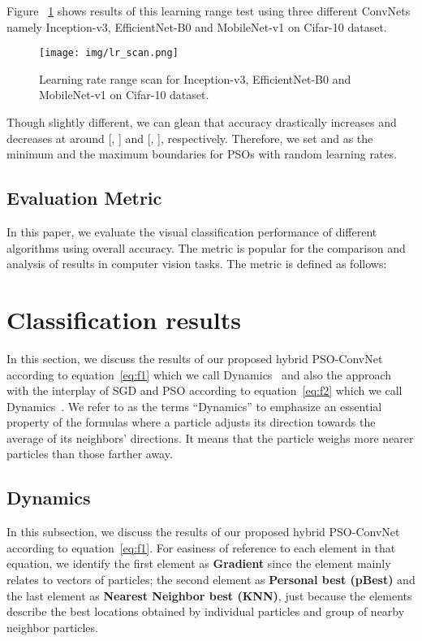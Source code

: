 \documentclass{ieeeaccess}
\begin{document}
Figure ~\ref{fig:lr_scan} shows results of this learning range test using three different ConvNets namely Inception-v3, EfficientNet-B0 and MobileNet-v1 on Cifar-10 dataset. 
\begin{figure}[htbp!]
\begin{center}
\texttt{[image: img/lr\_scan.png]}
\caption{Learning rate range scan for Inception-v3, EfficientNet-B0 and MobileNet-v1 on Cifar-10 dataset.}
\label{fig:lr_scan}
\end{center}
\end{figure}
Though slightly different, we can glean that accuracy drastically increases and decreases at around [, ] and [, ], respectively. Therefore, we set  and  as the minimum and the maximum boundaries for PSOs with random learning rates.
\subsection{Evaluation Metric}
In this paper, we evaluate the visual classification performance of different algorithms using overall accuracy. The metric is popular for the comparison and analysis of results in computer vision tasks. The metric is defined as follows:

\section{Classification results}
\label{sec:results}
In this section, we discuss the results of our proposed hybrid PSO-ConvNet according to equation~\eqref{eq:f1} which we call Dynamics~ and also the approach with the interplay of SGD and PSO according to equation~\eqref{eq:f2} which we call Dynamics~. We refer to as the terms ``Dynamics'' to emphasize an essential property of the formulas where a particle adjusts its direction towards the average of its neighbors' directions. It means that the particle weighs more nearer particles than those farther away.
\subsection{Dynamics~}
In this subsection, we discuss the results of our proposed hybrid PSO-ConvNet according to equation~\eqref{eq:f1}. For easiness of reference to each element in that equation, we identify the first element as \textbf{Gradient} since the element mainly relates to vectors of particles; the second element as \textbf{Personal best (pBest)} and the last element as \textbf{Nearest Neighbor best (KNN)}, just because the elements describe the best locations obtained by individual particles and group of nearby neighbor particles.
\end{document}
